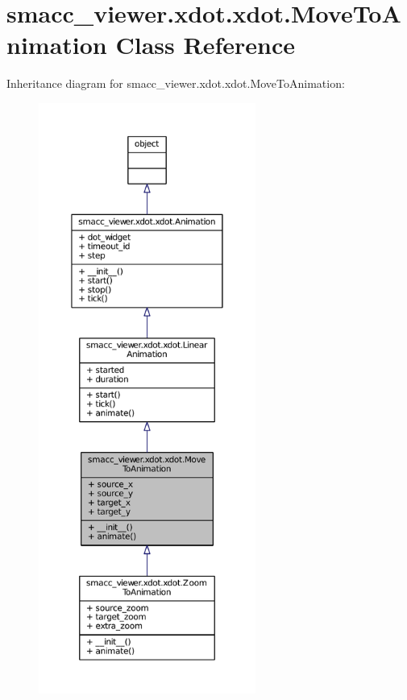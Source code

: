 \hypertarget{classsmacc__viewer_1_1xdot_1_1xdot_1_1MoveToAnimation}{}\section{smacc\+\_\+viewer.\+xdot.\+xdot.\+Move\+To\+Animation Class Reference}
\label{classsmacc__viewer_1_1xdot_1_1xdot_1_1MoveToAnimation}


Inheritance diagram for smacc\+\_\+viewer.\+xdot.\+xdot.\+Move\+To\+Animation\+:
\nopagebreak
\begin{figure}[H]
\begin{center}
\leavevmode
\includegraphics[height=550pt]{classsmacc__viewer_1_1xdot_1_1xdot_1_1MoveToAnimation__inherit__graph}
\end{center}
\end{figure}



